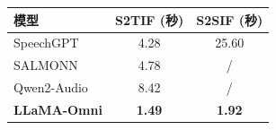 \begin{table}[!htbp]
    \label{tab:llamaomni_decode_time}
    \centering
    \small
    \begin{tabular}{lcc}
        \toprule
        \textbf{模型} & \textbf{S2TIF (秒)} & \textbf{S2SIF (秒)} \\
        \midrule
        SpeechGPT & 4.28 & 25.60 \\
        SALMONN & 4.78 & / \\
        Qwen2-Audio & 8.42 & / \\
        \textbf{LLaMA-Omni} & \textbf{1.49} & \textbf{1.92} \\
        \bottomrule
    \end{tabular}
\end{table}
